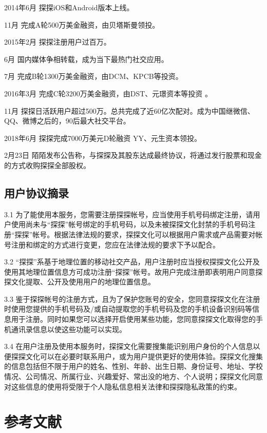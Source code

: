 \documentclass[UTF8]{ctexart}
\begin{document}
\begin{tcolorbox}
    2014年6月 探探iOS和Android版本上线。

    11月 完成A轮500万美金融资，由贝塔斯曼领投。

    2015年2月 探探注册用户过百万。

    6月 国内媒体争相转载，成为当下最热门社交应用。

    7月 完成B轮1300万美金融资，由DCM、KPCB等投资。

    2016年3月 完成C轮3200万美金融资，由DST、元璟资本等投资 。

    11月 探探日活跃用户超过500万。总共完成了近60亿次配对。成为中国继微信、QQ、微博之后的，90后最大社交平台。

    2018年6月 探探完成7000万美元D轮融资 YY、元生资本领投。

    2月23日 陌陌发布公告称，与探探及其股东达成最终协议，将通过发行股票和现金的方式收购探探全部股权。
\end{tcolorbox}

\subsection{用户协议摘录}
\begin{tcolorbox}
    3.1 为了能使用本服务，您需要注册探探帐号，应当使用手机号码绑定注册，请用户使用尚未与“探探”帐号绑定的手机号码，以及未被探探文化封禁的手机号码注册“探探”帐号。根据法律法规的要求，探探文化可以根据用户需求或产品需要对帐号注册和绑定的方式进行变更，您应在法律法规的要求下予以配合。

    3.2 “探探”系基于地理位置的移动社交产品，用户注册时应当授权探探文化公开及使用其地理位置信息方可成功注册“探探”帐号。故用户完成注册即表明用户同意探探文化提取、公开及使用用户的地理位置信息。

    3.3 鉴于探探帐号的注册方式，且为了保护您账号的安全，您同意探探文化在注册时使用您提供的手机号码及/或自动提取您的手机号码及您的手机设备识别码等信息用于注册。同时如果您可以选择开启使用某些功能，您同意探探文化取得您的手机通讯录信息以使这些功能可以实现。
    
    3.4 在用户注册及使用本服务时，探探文化需要搜集能识别用户身份的个人信息以便探探文化可以在必要时联系用户，或为用户提供更好的使用体验。探探文化搜集的信息包括但不限于用户的姓名、性别、年龄、出生日期、身份证号、地址、学校情况、公司情况、所属行业、兴趣爱好、常出没的地方、个人说明；探探文化同意对这些信息的使用将受限于个人隐私信息相关法律和探探隐私政策的约束。
\end{tcolorbox}


\section{参考文献}



\end{document}
